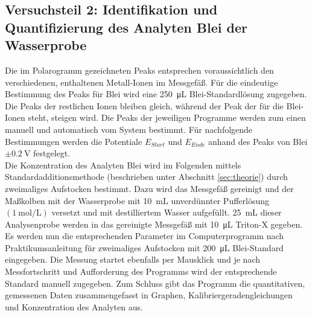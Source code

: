 \subsection{Versuchsteil 2: Identifikation und Quantifizierung des Analyten Blei der Wasserprobe}
Die im Polarogramm gezeichneten Peaks entsprechen voraussichtlich den verschiedenen, enthaltenen Metall-Ionen im Messgefäß. Für die eindeutige Bestimmung des Peaks für Blei wird eine \SI{250}{\micro \liter} Blei-Standardlösung zugegeben. Die Peaks der restlichen Ionen bleiben gleich, während der Peak der für die Blei-Ionen steht, steigen wird. Die Peaks der jeweiligen Programme werden zum einen manuell und automatisch vom System bestimmt. Für nachfolgende Bestimmungen werden die Potentiale $E_{Start}$ und $E_{Ende}$ anhand des Peaks von Blei $\pm \SI{0,2}{\volt}$ festgelegt.\\
Die Konzentration des Analyten Blei wird im Folgenden mittels Standardadditionsmethode (beschrieben unter Abschnitt \ref{sec:theorie}) durch zweimaliges Aufstocken bestimmt.\linebreak
Dazu wird das Messgefäß gereinigt und der Maßkolben mit der Wasserprobe mit \SI{10}{\milli \liter} unverdünnter Pufferlösung $\left(\SI{1}{\mol\per\liter}\right)$ versetzt und mit destilliertem Wasser aufgefüllt. \SI{25}{\milli \liter} dieser Analysenprobe werden in das gereinigte Messgefäß mit \SI{10}{\micro\liter} Triton-X gegeben. Es werden nun die entsprechenden Parameter im Computerprogramm nach Praktikumsanleitung für zweimaliges Aufstocken mit \SI{200}{\micro\liter} Blei-Standard eingegeben. 
Die Messung startet ebenfalls per Mausklick und je nach Messfortschritt und Aufforderung des Programms wird der entsprechende Standard manuell zugegeben. Zum Schluss gibt das Programm die quantitativen, gemessenen Daten zusammengefasst in Graphen, Kalibriergeradengleichungen und Konzentration des Analyten aus.

\newpage
